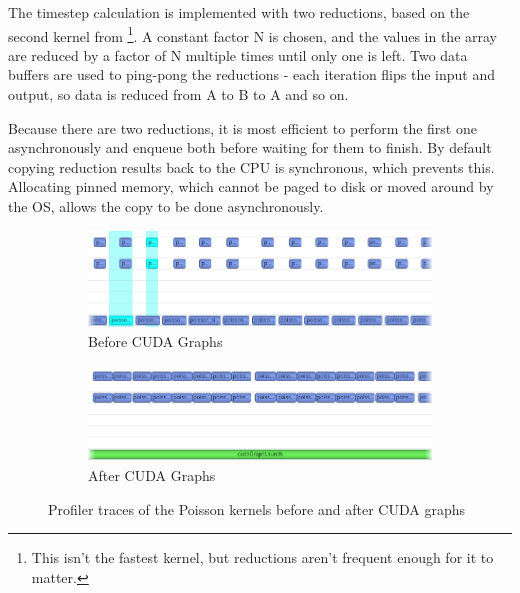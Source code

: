 The timestep calculation is implemented with two reductions, based on the second kernel from \cite{CUDAParallelReduction}\footnote{This isn't the fastest kernel, but reductions aren't frequent enough for it to matter.}.
A constant factor N is chosen, and the values in the array are reduced by a factor of N multiple times until only one is left.
Two data buffers are used to ping-pong the reductions - each iteration flips the input and output, so data is reduced from A to B to A and so on.

Because there are two reductions, it is most efficient to perform the first one asynchronously and enqueue both before waiting for them to finish.
By default copying reduction results back to the CPU is synchronous, which prevents this.
Allocating pinned memory, which cannot be paged to disk or moved around by the OS, allows the copy to be done asynchronously.

\begin{figure}
    \centering
    \begin{subfigure}{\textwidth}
        \includegraphics[width=\textwidth]{Ch48Implementation/figures/cudagraphs_before.png}
        \caption{Before CUDA Graphs}
    \end{subfigure}
    \vspace{1cm}
    \begin{subfigure}{\textwidth}
        \includegraphics[width=\textwidth]{Ch48Implementation/figures/cudagraphs_after.png}
        \caption{After CUDA Graphs}
    \end{subfigure}
    \caption{Profiler traces of the Poisson kernels before and after CUDA graphs}
    \label{fig:CudaGraphsImpact}
\end{figure}

